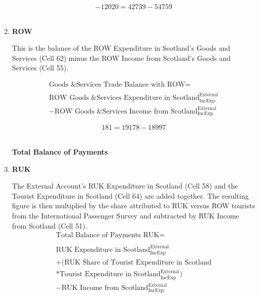 \begin{enumerate}
\begin{equation} \nonumber
-12020 = 42739-54759
\end{equation}\\


\item \textbf {ROW}

This is the balance of the ROW Expenditure in Scotland's Goods and Services (Cell 62) minus the ROW Income from Scotland's Goods and Services (Cell 55).

\begin{equation}
\begin{split}
\text{Goods \& Services Trade Balance with ROW} =  \\ \\
\text{ROW Goods \& Services Expenditure in Scotland}^\text{External}_\text{IncExp}\\
-\text{ROW Goods \& Services Income from Scotland}^\text{External}_\text{IncExp}
\end{split} \label{eq:2.5.72}
\end{equation}

\begin{equation} \nonumber
181 = 19178-18997
\end{equation}\\

\newpage

\begin{center}
\textbf{\LARGE Total Balance of Payments}
\end{center}

\item \textbf {RUK}

The External Account's RUK Expenditure in Scotland (Cell 58) and the Tourist Expenditure in Scotland (Cell 64) are added together. The resulting figure is then multiplied by the share attributed to RUK versus ROW tourists from the International Passenger Survey \cite{ONS2010a} and subtracted by RUK Income from Scotland (Cell 51).\\

\begin{equation}
\begin{split}
\text{Total Balance of Payments RUK} =  \\ \\
\text{RUK Expenditure in Scotland}^\text{External}_\text{IncExp}\\
+(\text{RUK Share of Tourist Expenditure in Scotland}\\
*\text{Tourist  Expenditure in Scotland}^\text{External}_\text{IncExp})\\
-\text{RUK Income from Scotland}^\text{External}_\text{IncExp}
\end{split} \label{eq:2.5.73}
\end{equation}


\end{enumerate}
